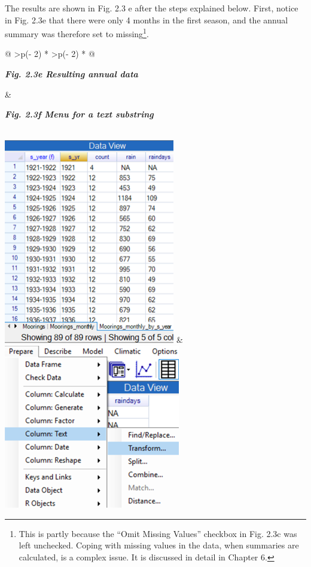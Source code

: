 \documentclass[
  letterpaper,
  DIV=11,
  numbers=noendperiod]{scrreprt}
\begin{document}
The results are shown in Fig. 2.3 e after the steps explained below.
First, notice in Fig. 2.3e that there were only 4 months in the first
season, and the annual summary was therefore set to missing\footnote{This
  is partly because the ``Omit Missing Values'' checkbox in Fig. 2.3c
  was left unchecked. Coping with missing values in the data, when
  summaries are calculated, is a complex issue. It is discussed in
  detail in Chapter 6.}.

\begin{longtable}[]{@{}
  >{\centering\arraybackslash}p{(\columnwidth - 2\tabcolsep) * }
  >{\centering\arraybackslash}p{(\columnwidth - 2\tabcolsep) * }@{}}
\toprule\noalign{}
\begin{minipage}[b]{\linewidth}\centering
\textbf{\emph{Fig. 2.3e Resulting annual data}}
\end{minipage} & \begin{minipage}[b]{\linewidth}\centering
\textbf{\emph{Fig. 2.3f Menu for a text substring}}
\end{minipage} \\
\midrule\noalign{}
\endhead
\bottomrule\noalign{}
\endlastfoot
\includegraphics[width=2.941in,height=3.522in]{figures/Fig2.3e.png} &
\includegraphics[width=3.028in,height=2.812in]{figures/Fig2.3f.png} \\
\end{longtable}
\end{document}
